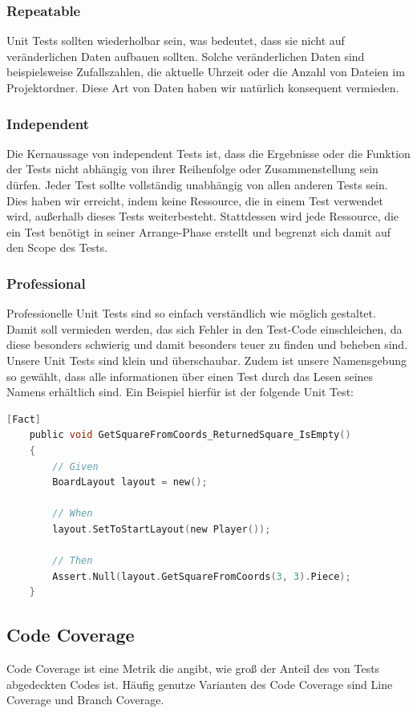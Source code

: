 \documentclass[
10pt, %
a4paper, %
oneside, %
headinclude,footinclude, %
BCOR5mm, %
]{scrartcl}
\begin{document}
\begin{onehalfspace}
\subsubsection{Repeatable}
Unit Tests sollten wiederholbar sein, was bedeutet, dass sie nicht auf veränderlichen Daten aufbauen sollten. Solche veränderlichen Daten sind beispielsweise Zufallszahlen, die aktuelle Uhrzeit oder die Anzahl von Dateien im Projektordner. Diese Art von Daten haben wir natürlich konsequent vermieden.
\subsubsection{Independent}
Die Kernaussage von independent Tests ist, dass die Ergebnisse oder die Funktion der Tests nicht abhängig von ihrer Reihenfolge oder Zusammenstellung sein dürfen. Jeder Test sollte vollständig unabhängig von allen anderen Tests sein. Dies haben wir erreicht, indem keine Ressource, die in einem Test verwendet wird, außerhalb dieses Tests weiterbesteht. Stattdessen wird jede Ressource, die ein Test benötigt in seiner Arrange-Phase erstellt und begrenzt sich damit auf den Scope des Tests.
\subsubsection{Professional}
Professionelle Unit Tests sind so einfach verständlich wie möglich gestaltet. Damit soll vermieden werden, das sich Fehler in den Test-Code einschleichen, da diese besonders schwierig und damit besonders teuer zu finden und beheben sind.
Unsere Unit Tests sind klein und überschaubar. Zudem ist unsere Namensgebung so gewählt, dass alle informationen über einen Test durch das Lesen seines Namens erhältlich sind. Ein Beispiel hierfür ist der folgende Unit Test:
\begin{lstlisting}[language=c, style=mStyle]
	[Fact]
	public void GetSquareFromCoords_ReturnedSquare_IsEmpty()
	{
		// Given
		BoardLayout layout = new();

		// When
		layout.SetToStartLayout(new Player());
		
		// Then
		Assert.Null(layout.GetSquareFromCoords(3, 3).Piece);
	}
\end{lstlisting}

\subsection{Code Coverage}
Code Coverage ist eine Metrik die angibt, wie 
groß der Anteil des von Tests abgedeckten Codes ist. Häufig genutze Varianten des Code Coverage sind Line Coverage und Branch Coverage.


\end{onehalfspace}
\end{document}
